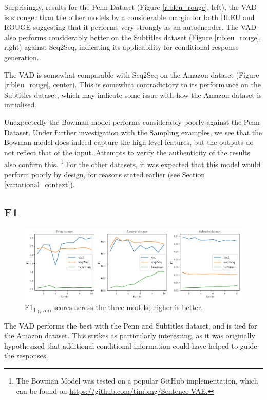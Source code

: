 \documentclass[12pt,twoside]{report}
\begin{document}

Surprisingly, results for the Penn Dataset (Figure \ref{r:bleu_rouge}, left), the VAD is stronger than the other models by a considerable margin for both BLEU and ROUGE suggesting that it performs very strongly as an autoencoder. The VAD also performs considerably better on the Subtitles dataset  (Figure \ref{r:bleu_rouge}, right) against Seq2Seq, indicating its applicability for conditional response generation.

The VAD is somewhat comparable with Seq2Seq on the Amazon dataset  (Figure \ref{r:bleu_rouge}, center). This is somewhat contradictory to its performance on the Subtitles dataset, which may indicate some issue with how the Amazon dataset is initialised.

Unexpectedly the Bowman model performs considerably poorly against the Penn Dataset. Under further investigation with the Sampling examples, we see that the Bowman model does indeed capture the high level features, but the outputs do not reflect that of the input. Attempts to verify the authenticity of the results also confirm this. \footnote{The Bowman Model was tested on a popular GitHub implementation, which can be found on \href{https://github.com/timbmg/Sentence-VAE}{https://github.com/timbmg/Sentence-VAE.}
} For the other datasets, it was expected that this model would perform poorly by design, for reasons stated earlier (see Section \ref{variational_context}). 

\subsection{F1}

\begin{figure}[!ht]
	\centering
	\includegraphics[width=150mm]{results/f1.pdf}
	\caption{F1\textsubscript{1-gram} scores across the three models; higher is better.\label{r:f1}}
	\end{figure}
	
The VAD performs the best with the Penn and Subtitles dataset, and is tied for the Amazon dataset. This strikes as particularly interesting, as it was originally hypothesized that additional conditional information could have helped to guide the responses.
\end{document}
